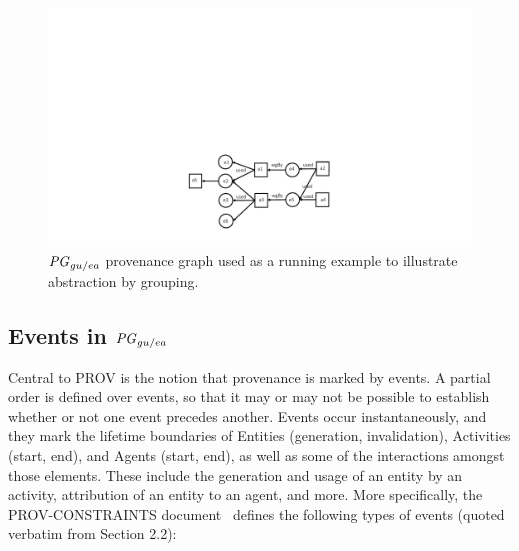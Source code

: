 
\begin{figure}
\centering
\includegraphics[scale=.6]{reworked-fig5.pdf} 
\caption{$\mathit{PG}_{gu/ea}$ provenance graph used as a running example to illustrate abstraction by grouping.}  \label{fig:baseline-ug-ae}
\end{figure}

\subsection{Events in $\mathit{PG}_{gu/ea}$}  \label{sec:prov-events}

\label{sec:events}

Central to PROV is the notion that provenance is marked by events. A partial order is defined over events, so that it may or may not be possible to establish whether or not one event precedes another. 
%
Events occur instantaneously, and they mark the lifetime boundaries of Entities (generation, invalidation), Activities (start, end), and Agents (start, end), as well as some of the interactions amongst those elements. These include the generation and usage of an entity by an activity, attribution of an entity to an agent, and more. More specifically, the PROV-CONSTRAINTS document~\citep{w3c-prov-constraints} defines the following types of events (quoted verbatim from Section 2.2):

